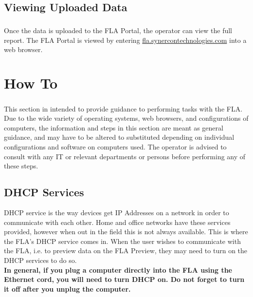 \documentclass[11pt, oneside]{book}
\begin{document}
\section{Viewing Uploaded Data}
\paragraph{  }
Once the data is uploaded to the FLA Portal, the operator can view the full report. The FLA Portal is viewed by entering \url{fla.synercontechnologies.com} into a web browser.

\chapter{How To}
\paragraph{  }
This section in intended to provide guidance to performing tasks with the FLA. Due to the wide variety of operating systems, web browsers, and configurations of computers, the information and steps in this section are meant as general guidance, and may have to be altered to substituted depending on individual configurations and software on computers used. The operator is advised to consult with any IT or relevant departments or persons before performing any of these steps.
\section{DHCP Services}\label{sec:dhcp_service}
\label{subsec:dhcp_services}
DHCP service is the way devices get IP Addresses on a network in order to communicate with each other. Home and office networks have these services provided, however when out in the field this is not always available. This is where the FLA's DHCP service comes in. When the user wishes to communicate with the FLA, i.e. to preview data on the FLA Preview, they may need to turn on the DHCP services to do so.\\
\textbf{In general, if you plug a computer directly into the FLA using the Ethernet cord, you will need to turn DHCP on. Do not forget to turn it off after you unplug the computer.}
\end{document}
